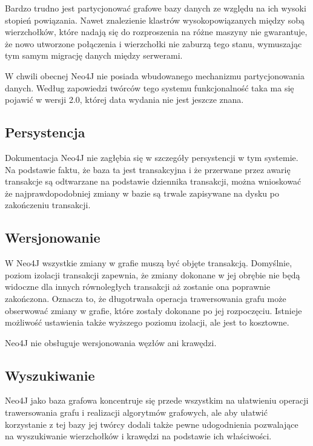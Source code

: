 Bardzo trudno jest partycjonować grafowe bazy danych ze względu na ich wysoki stopień powiązania.
Nawet znalezienie klastrów wysokopowiązanych między sobą wierzchołków, które nadają się do rozproszenia na różne maszyny nie gwarantuje, że nowo utworzone połączenia i wierzchołki nie zaburzą tego stanu, wymuszając tym samym migrację danych między serwerami.

W chwili obecnej Neo4J nie posiada wbudowanego mechanizmu partycjonowania danych.
Według zapowiedzi twórców tego systemu funkcjonalność taka ma się pojawić w wersji 2.0, której data wydania nie jest jeszcze znana.

\subsection*{Persystencja}

Dokumentacja Neo4J nie zagłębia się w szczegóły persystencji w tym systemie.
Na podstawie faktu, że baza ta jest transakcyjna i że przerwane przez awarię transakcje są odtwarzane na podstawie dziennika transakcji, można wnioskować że najprawdopodobniej zmiany w bazie są trwale zapisywane na dysku po zakończeniu transakcji.

\subsection*{Wersjonowanie}

W Neo4J wszystkie zmiany w grafie muszą być objęte transakcją.
Domyślnie, poziom izolacji transakcji zapewnia, że zmiany dokonane w jej obrębie nie będą widoczne dla innych równoległych transakcji aż zostanie ona poprawnie zakończona.
Oznacza to, że długotrwała operacja trawersowania grafu może obserwować zmiany w grafie, które zostały dokonane po jej rozpoczęciu.
Istnieje możliwość ustawienia także wyższego poziomu izolacji, ale jest to kosztowne.

Neo4J nie obsługuje wersjonowania węzłów ani krawędzi.

\subsection*{Wyszukiwanie}

Neo4J jako baza grafowa koncentruje się przede wszystkim na ułatwieniu operacji trawersowania grafu i realizacji algorytmów grafowych, ale aby ułatwić korzystanie z tej bazy jej twórcy dodali także pewne udogodnienia pozwalające na wyszukiwanie wierzchołków i krawędzi na podstawie ich właściwości.

